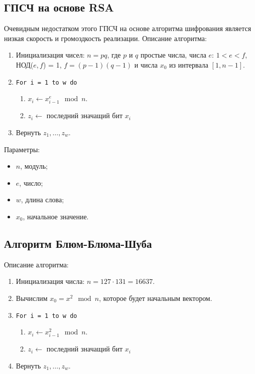 \documentclass[bachelor, och, labwork]{SCWorks}
\begin{document}
\subsection{ГПСЧ на основе RSA}
Очевидным недостатком этого ГПСЧ на основе алгоритма шифрования является низкая
скорость и громоздкость реализации. Описание алгоритма:
\begin{enumerate}
  \item Инициализация чисел: $n = pq$, где $p$ и $q$ простые числа, числа $e$: $1 < e < f$, НОД($e, f$) = 1, $f = (p - 1)(q - 1)$ и числа $x_0$ из интервала $[1, n - 1]$.
  \item \texttt{For i = 1 to w do}
        \begin{enumerate}
          \item $x_i \leftarrow x_{i-1}^e \mod n$.
          \item $z_i \leftarrow $ последний значащий бит $x_i$
        \end{enumerate}
  \item Вернуть $z_1, \dots, z_w$.
\end{enumerate}

Параметры:
\begin{itemize}
  \item $n$, модуль;
  \item $e$, число;
  \item $w$, длина слова;
  \item $x_0$, начальное значение.
\end{itemize}

\subsection{Алгоритм Блюм-Блюма-Шуба}
Описание алгоритма:
\begin{enumerate}
  \item Инициализация числа: $n = 127 \cdot 131 = 16637$.
  \item Вычислим $x_0 = x^2 \mod n$, которое будет начальным вектором.
  \item \texttt{For i = 1 to w do}
        \begin{enumerate}
          \item $x_i \leftarrow x_{i-1}^2 \mod n$.
          \item $z_i \leftarrow $ последний значащий бит $x_i$
        \end{enumerate}
  \item Вернуть $z_1, \dots, z_w$.
\end{enumerate}
\end{document}
